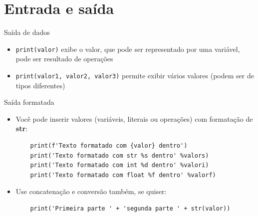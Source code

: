 \section{Entrada e saída}
\begin{frame}[containsverbatim]{Saída de dados}
	\begin{itemize} 	
		\item \texttt{print(valor)} exibe o valor, que pode ser representado por uma variável, pode ser resultado de operações
		
		\item \texttt{print(valor1, valor2, valor3)} permite exibir vários valores (podem ser de tipos diferentes)				
		
	\end{itemize}		 	  
  \end{frame}
  	
\begin{frame}[containsverbatim]{Saída formatada}
\begin{itemize}	
	\item Você pode inserir valores (variáveis, literais ou operações) com formatação de \textbf{str}:

\begin{verbatim}
	print(f'Texto formatado com {valor} dentro')
	print('Texto formatado com str %s dentro' %valors)
	print('Texto formatado com int %d dentro' %valori)
	print('Texto formatado com float %f dentro' %valorf)
\end{verbatim}	

	\item Use concatenação e conversão também, se quiser: 

\begin{verbatim}
	print('Primeira parte ' + 'segunda parte ' + str(valor))
\end{verbatim}	
\end{itemize}	
  \end{frame}

